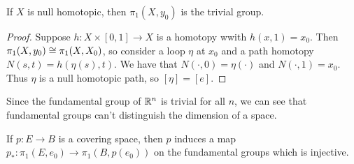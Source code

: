 \begin{theorem}
	If $X$ is null homotopic, then $\pi_1(X,y_0)$ is the trivial group.
\end{theorem}
\begin{proof}
	Suppose $h:X\times[0,1]\rightarrow X$ is a homotopy wwith $h(x,1)=x_0$.  Then $\pi_1(X,y_0)\cong \pi_1(X,X_0)$, so consider a loop $\eta$ at $x_0$ and a path homotopy $N(s,t)=h(\eta(s),t)$.  We have that $N(\cdot,0)=\eta(\cdot)$ and $N(\cdot,1)=x_0$. Thus $\eta$ is a null homotopic path, so $[\eta]=[e]$.
	
\end{proof}

Since the fundamental group of $\mathbb{R}^n$ is trivial for all $n$, we can see that fundamental groups can't distinguish the dimension of a space.

\begin{theorem}
	If $p:E\rightarrow B$ is a covering space, then $p$ induces a map $p_\ast:\pi_1(E,e_0)\rightarrow \pi_1(B,p(e_0))$ on the fundamental groups which is injective.
\end{theorem}

